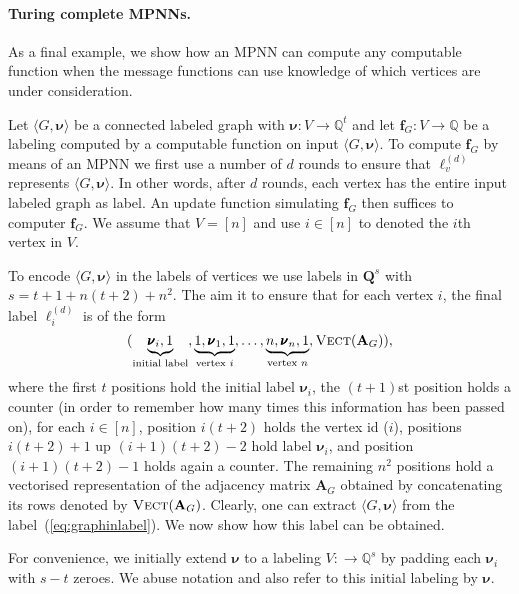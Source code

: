\paragraph{Turing complete MPNNs.}
 As a final example, we show how an MPNN can compute any computable function when the message functions can use knowledge of which vertices are under consideration. 

\begin{example}\normalfont
	Let $\langle G,\pmb{\nu}\rangle$ be a connected labeled graph with $\pmb{\nu}:V\to\mathbb{Q}^t$ and let $\mathbf{f}_G:V\to\mathbb{Q}$ be a labeling 
	computed by a computable function on input 	$\langle G,\pmb{\nu}\rangle$. To compute $\mathbf{f}_G$ by means of an MPNN we first use a number  of $d$ rounds  to ensure that $\pmb{\ell}^{(d)}_v$ represents $\langle G,\pmb{\nu}\rangle$. In other words, after $d$ rounds,  each vertex has the entire input labeled graph as label. An update function simulating $\mathbf{f}_G$ then suffices to computer $\mathbf{f}_G$. We assume that $V=[n]$ and use $i\in[n]$ to denoted the $i$th vertex in $V$.
	
To encode $\langle G,\pmb{\nu}\rangle$ in the labels of vertices we use labels in $\mathbf{Q}^s$ with 
$s=t+1+n(t+2)+n^2$. The aim it to ensure that for each vertex $i$, the final label $\pmb{\ell}_i^{(d)}$ is of the form
\begin{equation}
(\underbrace{\vphantom{f}\pmb{\nu}_i,1}_{\text{initial label}},\underbrace{\vphantom{f}1,\pmb{\nu}_1,1}_{\text{vertex $i$}},\ldots,\underbrace{\vphantom{f}n,\pmb{\nu}_n,1}_{\text{vertex $n$}},\textsc{Vect}(\mathbf{A}_G)), \label{eq:graphinlabel}
\end{equation}
where the first $t$ positions hold the initial label $\pmb{\nu}_i$,
the $(t+1)$st position holds a counter (in order to remember how many times
this information has been passed on), for each $i\in[n]$, position
$i(t+2)$ holds the vertex id ($i$), positions $i(t+2)+1$ up $(i+1)(t+2)-2$
hold label $\pmb{\nu}_i$, and position $(i+1)(t+2)-1$ holds again a counter.
The remaining $n^2$ positions hold a vectorised representation of the adjacency matrix $\mathbf{A}_G$ obtained by concatenating its rows denoted by $\textsc{Vect}(\mathbf{A}_G)$. Clearly, one can extract 
$\langle G,\pmb{\nu}\rangle$ from the label~(\ref{eq:graphinlabel}). We now show how this label can be obtained.

For convenience, we initially extend $\pmb{\nu}$
to a labeling $V:\to\mathbb{Q}^s$ by padding each $\pmb{\nu}_i$ with $s-t$ zeroes. We abuse notation and also refer to this initial labeling by $\pmb{\nu}$.


\end{example}
